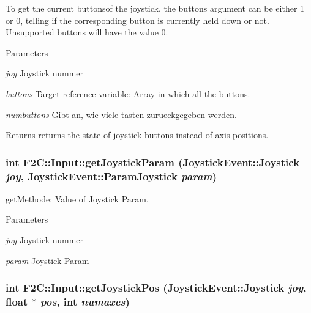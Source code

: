 To get the current buttonsof the joystick. the buttons argument can be either 1 or 0, telling if the corresponding button is currently held down or not. Unsupported buttons will have the value 0. 
\begin{DoxyParams}{Parameters}
\item[{\em joy}]Joystick nummer \item[{\em buttons}]Target reference variable: Array in which all the buttons. \item[{\em numbuttons}]Gibt an, wie viele tasten zurueckgegeben werden. \end{DoxyParams}
\begin{DoxyReturn}{Returns}
returns the state of joystick buttons instead of axis positions. 
\end{DoxyReturn}
\hypertarget{class_f2_c_1_1_input_ad2b10c018d3a0059dcfc7325de011d45}{
\subsubsection[{getJoystickParam}]{\setlength{\rightskip}{0pt plus 5cm}int F2C::Input::getJoystickParam ({\bf JoystickEvent::Joystick} {\em joy}, \/  {\bf JoystickEvent::ParamJoystick} {\em param})}}
\label{class_f2_c_1_1_input_ad2b10c018d3a0059dcfc7325de011d45}


getMethode: Value of Joystick Param. 
\begin{DoxyParams}{Parameters}
\item[{\em joy}]Joystick nummer \item[{\em param}]Joystick Param \end{DoxyParams}
\hypertarget{class_f2_c_1_1_input_a4638b65b4be2c3c5254531b6e0e54a9b}{
\subsubsection[{getJoystickPos}]{\setlength{\rightskip}{0pt plus 5cm}int F2C::Input::getJoystickPos ({\bf JoystickEvent::Joystick} {\em joy}, \/  float $\ast$ {\em pos}, \/  int {\em numaxes})}}
\label{class_f2_c_1_1_input_a4638b65b4be2c3c5254531b6e0e54a9b}


